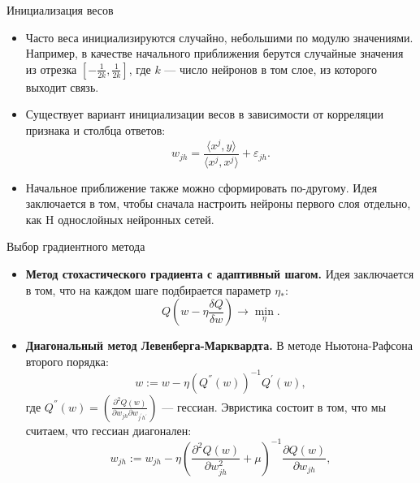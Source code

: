 \documentclass[11pt]{beamer}
\begin{document}
	\begin{frame}{Инициализация весов}
		\begin{itemize}
			\item Часто веса инициализируются случайно, небольшими по модулю значениями. Например, в качестве начального приближения берутся случайные значения из отрезка $[-\frac{1}{2k}, \frac{1}{2k}]$, где $k$ --- число нейронов в том слое, из которого выходит связь.
			\item Существует вариант инициализации весов в зависимости от корреляции признака и столбца ответов:
			\begin{equation*}
				w_{jh}=\frac{\langle x^j, y\rangle}{\langle x^j, x^j\rangle} + \varepsilon_{jh}.
			\end{equation*}
			
			\item Начальное приближение также можно сформировать по-другому. Идея заключается в том, чтобы сначала настроить нейроны первого слоя отдельно, как H однослойных нейронных сетей.
		\end{itemize}
	\end{frame}

	\begin{frame}{Выбор градиентного метода}
		\begin{itemize}
			\item \textbf{Метод стохастического градиента с адаптивный шагом.} Идея заключается в том, что на каждом шаге подбирается параметр $\eta_{*}$:
			\begin{equation*}
				Q(w - \eta \frac{\delta Q}{\delta w}) \rightarrow \min_\eta.
			\end{equation*}

			\item \textbf{Диагональный метод Левенберга-Марквардта.}
			В методе Ньютона-Рафсона второго порядка:
			\begin{equation*}
				w := w - \eta (Q^{''}(w))^{-1} Q^{'}(w),
			\end{equation*}
			где $Q^{''}(w) = \left( \frac{\partial^2 Q(w) }{\partial w_{jh} \partial w_{j^{'}h^{'}}}   \right)$ --- гессиан.
			Эвристика состоит в том, что мы считаем, что гессиан диагонален:
			\begin{equation*}
				w_{jh} := w_{jh} - \eta \left(  \frac{\partial^2 Q(w) }{\partial w_{jh}^2} + \mu  \right) ^{-1} \frac{\partial Q(w) }{\partial w_{jh}}, 
			\end{equation*} 
		\end{itemize}
	\end{frame}
\end{document}
